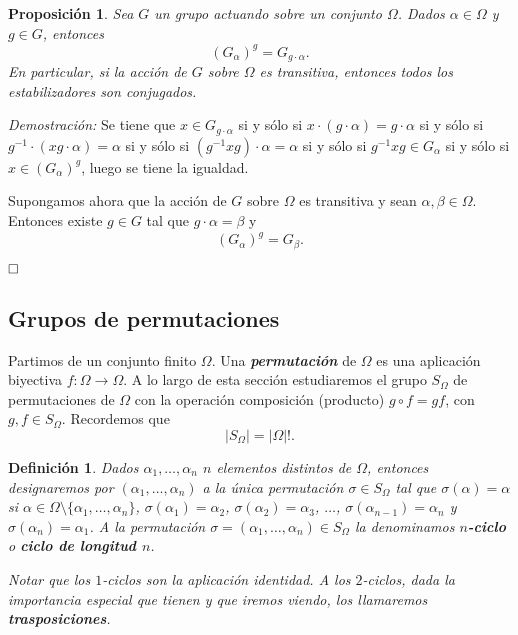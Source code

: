 \documentclass[12pt]{article}
\newtheorem{proposition}[theorem]{Proposición}
\newtheorem{definition}[theorem]{Definición}
\begin{document}
\begin{proposition}Sea $G$ un grupo actuando sobre un conjunto $\Omega$. Dados $\alpha \in \Omega$ y $g \in G$, entonces $$(G_\alpha)^g = G_{g\cdot \alpha}.$$ En particular, si la acción de $G$ sobre $\Omega$ es transitiva, entonces todos los estabilizadores son conjugados.
\end{proposition}
\emph{Demostración: }Se tiene que $x \in G_{g\cdot \alpha}$ si y sólo si $x \cdot(g\cdot \alpha) = g \cdot \alpha$ si y sólo si $g^{-1} \cdot(xg \cdot \alpha) = \alpha$ si y sólo si $(g^{-1}xg) \cdot \alpha = \alpha$ si y sólo si $g^{-1}xg \in G_\alpha$ si y sólo si $x \in (G_\alpha)^g$, luego se tiene la igualdad.

Supongamos ahora que la acción de $G$ sobre $\Omega$ es transitiva y sean $\alpha, \beta \in \Omega$. Entonces existe $g \in G$ tal que $g \cdot \alpha = \beta$ y $$(G_\alpha)^g = G_\beta.$$

$\hfill \square$

\subsection{Grupos de permutaciones}

Partimos de un conjunto finito $\Omega$. Una \textbf{\textit{permutación}} de $\Omega$ es una aplicación biyectiva $f \colon \Omega \longrightarrow \Omega$. A lo largo de esta sección estudiaremos el grupo $S_\Omega$ de permutaciones de $\Omega$ con la operación composición (producto) $g \circ f = gf$, con $g,f \in S_\Omega$. Recordemos que $$|S_\Omega| = |\Omega|!.$$

\begin{definition}Dados $\alpha_1, \ldots, \alpha_n$ $n$ elementos distintos de $\Omega$, entonces designaremos por $(\alpha_1, \ldots, \alpha_n)$ a la única permutación $\sigma \in S_\Omega$ tal que $\sigma (\alpha) = \alpha$ si $\alpha \in \Omega \setminus \lbrace \alpha_1, \ldots, \alpha_n \rbrace$, $\sigma (\alpha_1)=\alpha_2$, $\sigma (\alpha_2) = \alpha_3$, $\ldots$, $\sigma(\alpha_{n-1}) = \alpha_n$ y $\sigma(\alpha_n) = \alpha_1$. A la permutación $\sigma = (\alpha_1, \ldots, \alpha_n ) \in S_\Omega$ la denominamos \textbf{$n$-ciclo} o \textbf{ciclo de longitud $n$}.

Notar que los $1$-ciclos son la aplicación identidad. A los $2$-ciclos, dada la importancia especial que tienen y que iremos viendo, los llamaremos \textbf{trasposiciones}.
\end{definition}
\end{document}
